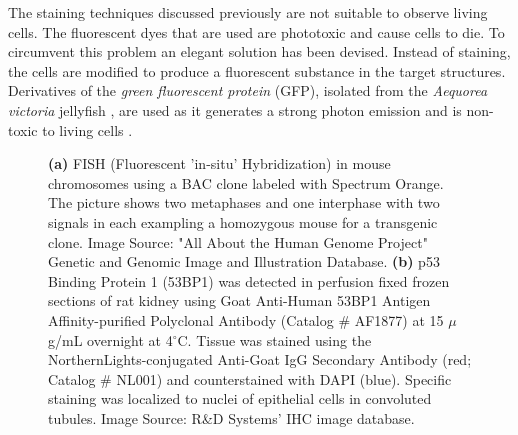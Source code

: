 \begin{definition}
	The staining techniques discussed previously are not suitable to observe living cells.
	The fluorescent dyes that are used are phototoxic and cause cells to die. To circumvent this problem an elegant solution has been devised.
	Instead of staining, the cells are modified to produce a fluorescent substance in the target structures.
	Derivatives of the \textit{green fluorescent protein} (GFP), isolated from the \textit{Aequorea victoria} jellyfish \citep{Tsien1998,LichtmanConchello2005,Fatima2008}, are used as it generates a strong photon emission and is non-toxic to living cells \citep{Danek2012,Hubeny2008,Dobrucki2013}.
\end{definition}


\begin{figure}[!t]
	\centering
	\caption{\textbf{(a)} FISH (Fluorescent 'in-situ' Hybridization) in mouse chromosomes using a BAC clone labeled with Spectrum Orange. The picture shows two metaphases and one interphase with two signals in each exampling a homozygous mouse for a transgenic clone. Image Source: "All About the Human Genome Project" Genetic and Genomic Image and Illustration Database. %
	\textbf{(b)} p53 Binding Protein 1 (53BP1) was detected in perfusion fixed frozen sections of rat kidney using Goat Anti-Human 53BP1 Antigen Affinity-purified Polyclonal Antibody (Catalog \# AF1877) at 15 $\mu$g/mL overnight at 4$^{\circ}$C. Tissue was stained using the NorthernLights-conjugated Anti-Goat IgG Secondary Antibody (red; Catalog \# NL001) and counterstained with DAPI (blue). Specific staining was localized to nuclei of epithelial cells in convoluted tubules. Image Source: R\&D Systems' IHC image database.}
	\label{fig:stainingtechniques}
\end{figure}

